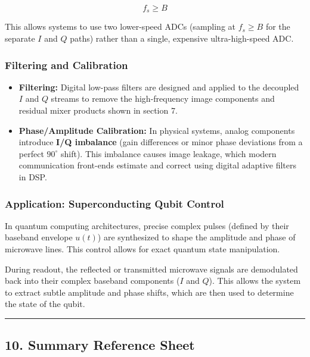 \documentclass[
]{article}
\providecommand{\tightlist}{%
  \setlength{\itemsep}{0pt}\setlength{\parskip}{0pt}}
\begin{document}
\[f_s \ge B\]

This allows systems to use two lower-speed ADCs (sampling at
\(f_s \ge B\) for the separate \(I\) and \(Q\) paths) rather than a
single, expensive ultra-high-speed ADC.

\subsubsection{Filtering and
Calibration}\label{filtering-and-calibration}

\begin{itemize}
\tightlist
\item
  \textbf{Filtering:} Digital low-pass filters are designed and applied
  to the decoupled \(I\) and \(Q\) streams to remove the high-frequency
  image components and residual mixer products shown in section 7.
\item
  \textbf{Phase/Amplitude Calibration:} In physical systems, analog
  components introduce \textbf{I/Q imbalance} (gain differences or minor
  phase deviations from a perfect \(90^\circ\) shift). This imbalance
  causes image leakage, which modern communication front-ends estimate
  and correct using digital adaptive filters in DSP.
\end{itemize}

\subsubsection{Application: Superconducting Qubit
Control}\label{application-superconducting-qubit-control}

In quantum computing architectures, precise complex pulses (defined by
their baseband envelope \(u(t)\)) are synthesized to shape the amplitude
and phase of microwave lines. This control allows for exact quantum
state manipulation.

During readout, the reflected or transmitted microwave signals are
demodulated back into their complex baseband components (\(I\) and
\(Q\)). This allows the system to extract subtle amplitude and phase
shifts, which are then used to determine the state of the qubit.

\begin{center}\rule{0.5\linewidth}{0.5pt}\end{center}

\subsection{10. Summary Reference Sheet}\label{summary-reference-sheet}
\end{document}
